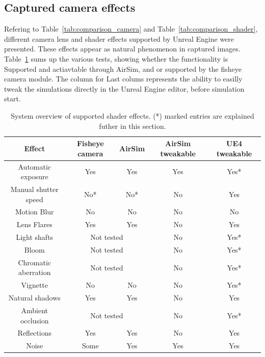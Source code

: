 \subsection{Captured camera effects}

Refering to Table~\ref{tab:comparison_camera} and Table~\ref{tab:comparison_shader}, different camera lens and shader effects supported by Unreal Engine were presented. These effects appear as natural phenomenon in captured images. Table~\ref{tab:res_shader_effects} sums up the various tests, showing whether the functionality is Supported and actiavtable through AirSim, and or supported by the fisheye camera module. The column for Last colums represents the ability to easilly tweak the simulations directly in the Unreal Engine editor, before simulation start.

\begin{table}[!htb]
    \centering
    \begin{tabular}{|c|c|c|c|c|} \hline
        \textbf{Effect} & Fisheye camera & AirSim & AirSim tweakable & UE4 tweakable \\ \hline \hline
        Automatic exposure & Yes & Yes & Yes & Yes* \\ \hline                 
        Manual shutter speed & No* & No* & No & Yes \\ \hline
        Motion Blur & No & No & No & No \\ \hline
        Lens Flares & Yes & Yes & No & Yes \\ \hline
        Light shafts & \multicolumn{2}{c|}{Not tested} & No & Yes* \\ \hline
        Bloom & \multicolumn{2}{c|}{Not tested} & No & Yes* \\ \hline
        Chromatic aberration & \multicolumn{2}{c|}{Not tested} & No & Yes* \\ \hline
        Vignette & No & No & No & Yes* \\ \hline
        Natural shadows & Yes & Yes & No & Yes \\ \hline
        Ambient occlusion & \multicolumn{2}{c|}{Not tested} & No & Yes* \\ \hline
        Reflections & Yes & Yes & No & Yes \\ \hline
        Noise & Some & Yes & Yes & Yes \\ \hline
        
    \end{tabular}
    \caption{System overview of supported shader effects. (*) marked entries are explained futher in this section.}
    \label{tab:res_shader_effects}
\end{table}

